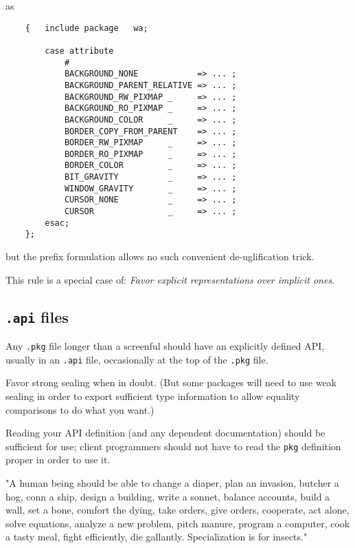 as

\begin{verbatim}
    {   include package   wa;

        case attribute
            #
            BACKGROUND_NONE            => ... ;
            BACKGROUND_PARENT_RELATIVE => ... ;
            BACKGROUND_RW_PIXMAP _     => ... ;
            BACKGROUND_RO_PIXMAP _     => ... ;
            BACKGROUND_COLOR     _     => ... ;
            BORDER_COPY_FROM_PARENT    => ... ;
            BORDER_RW_PIXMAP     _     => ... ;
            BORDER_RO_PIXMAP     _     => ... ;
            BORDER_COLOR         _     => ... ;
            BIT_GRAVITY          _     => ... ; 
            WINDOW_GRAVITY       _     => ... ;
            CURSOR_NONE          _     => ... ;
            CURSOR               _     => ... ;
        esac;
    };
\end{verbatim}

but the prefix formulation allows no such convenient de-uglification trick.

This rule is a special case of: {\it Favor explicit representations over implicit ones}.

\subsection{{\tt .api} files}

Any {\tt .pkg} file longer than a screenful should have an explicitly 
defined API, usually in an {\tt .api} file, occasionally at the top 
of the {\tt .pkg} file.

Favor strong sealing when in doubt.  (But some packages will need 
to use weak sealing in order to export sufficient type information 
to allow equality comparisons to do what you want.) 

Reading your {\sc API} definition (and any dependent documentation) should 
be sufficient for use;  client programmers should not have to read 
the {\tt pkg} definition proper in order to use it.




    "A human being should be able to change a diaper, plan an invasion,
     butcher a hog, conn a ship, design a building, write a sonnet, balance 
     accounts, build a wall, set a bone, comfort the dying, take orders,
     give orders, cooperate, act alone, solve equations, analyze a new 
     problem, pitch manure, program a computer, cook a tasty meal, fight 
     efficiently, die gallantly. Specialization is for insects."

